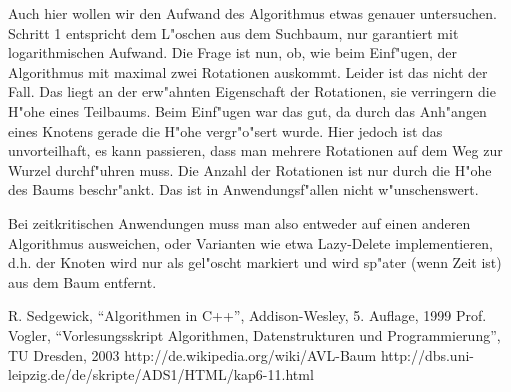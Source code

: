 \documentclass[a4paper,titlepage]{article}
\begin{document}
\begin{appendix}
Auch hier wollen wir den Aufwand des Algorithmus etwas genauer
untersuchen. Schritt 1 entspricht dem L"oschen aus dem Suchbaum,
nur garantiert mit logarithmischen Aufwand. Die Frage ist nun, ob,
wie beim Einf"ugen, der Algorithmus mit maximal zwei Rotationen
auskommt. Leider ist das nicht der Fall. Das liegt an der
erw"ahnten Eigenschaft der Rotationen, sie verringern die H"ohe
eines Teilbaums. Beim Einf"ugen war das gut, da durch das
Anh"angen eines Knotens gerade die H"ohe vergr"o"sert wurde. Hier
jedoch ist das unvorteilhaft, es kann passieren, dass man mehrere
Rotationen auf dem Weg zur Wurzel durchf"uhren muss. Die Anzahl
der Rotationen ist nur durch die H"ohe des Baums beschr"ankt. Das
ist in Anwendungsf"allen nicht w"unschenswert.

Bei zeitkritischen Anwendungen muss man also entweder auf einen
anderen Algorithmus ausweichen, oder Varianten wie etwa
Lazy-Delete implementieren, d.h. der Knoten wird nur als gel"oscht
markiert und wird sp"ater (wenn Zeit ist) aus dem Baum entfernt.



\begin{thebibliography}{99}
     R. Sedgewick, "`Algorithmen in C++"', Addison-Wesley, 5.
    Auflage, 1999
     Prof. Vogler, "`Vorlesungsskript Algorithmen,
    Datenstrukturen und Programmierung"', TU Dresden, 2003
     http://de.wikipedia.org/wiki/AVL-Baum
     http://dbs.uni-leipzig.de/de/skripte/ADS1/HTML/kap6-11.html
\end{thebibliography}





\end{appendix}
\end{document}
